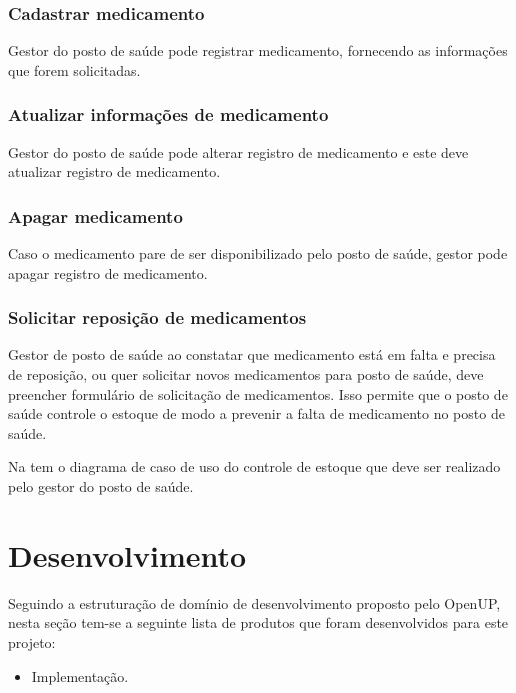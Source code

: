 \subsubsection{Cadastrar medicamento}

Gestor do posto de saúde pode registrar medicamento, fornecendo as informações que forem solicitadas.

\subsubsection{Atualizar informações de medicamento}

Gestor do posto de saúde pode alterar registro de medicamento e este deve atualizar registro de medicamento. 

\subsubsection{Apagar medicamento}

Caso o medicamento pare de ser disponibilizado pelo posto de saúde, gestor pode apagar registro de medicamento.

\subsubsection{Solicitar reposição de medicamentos}
Gestor de posto de saúde ao constatar que medicamento está em falta e precisa de reposição, ou quer solicitar novos medicamentos para posto de saúde, deve preencher formulário de solicitação de medicamentos. Isso permite que o posto de saúde controle o estoque de modo a prevenir a falta de medicamento no posto de saúde.

Na  tem o diagrama de caso de uso do controle de estoque que deve ser realizado pelo gestor do posto de saúde.

%



\section{Desenvolvimento}

Seguindo a estruturação de domínio de desenvolvimento proposto pelo \acrfull{OpenUP}, nesta seção tem-se a seguinte lista de produtos que foram desenvolvidos para este projeto:

\begin{itemize}
    \item Implementação.
  \end{itemize}

